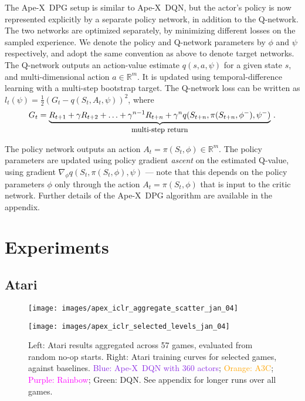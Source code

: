 \documentclass{article} \PassOptionsToPackage{usenames,dvipsnames}{xcolor}
\def\apex{Ape-X}
\def\smallcaption#1{\caption{\small #1}\vspace{-0.4cm}}
\begin{document}
The  \apex\ DPG setup is similar to \apex\ DQN, but the actor's policy is now represented explicitly by a separate policy network, in addition to the Q-network. The two networks are optimized separately, by minimizing different losses on the sampled experience. We denote the policy and Q-network parameters by $\phi$ and $\psi$ respectively, and adopt the same convention as above to denote target networks. The Q-network outputs an action-value estimate $q(s, a, \psi)$ for a given state $s$, and multi-dimensional action $a \in \mathbb{R}^m$. It is updated using temporal-difference learning with a multi-step bootstrap target. The Q-network loss can be written as $l_t(\psi) = \frac{1}{2}(G_t - q(S_t, A_t, \psi))^2$, where
\[
G_t = \underbrace{
    R_{t+1} + \gamma R_{t+2} + \ldots + \gamma^{n-1} R_{t+n} + \gamma^n q(S_{t+n}, \pi(S_{t+n}, \phi^-), \psi^-)}_{\mbox{\small multi-step return}} \,.
\]

The policy network outputs an action $A_t = \pi(S_t, \phi) \in \mathbb{R}^m$. The policy parameters are updated using policy gradient \emph{ascent} on the estimated Q-value, using gradient $\nabla_{\phi} q(S_t, \pi(S_t, \phi), \psi)$ --- note that this depends on the policy parameters $\phi$ only through the action $A_t =\pi(S_t, \phi)$ that is input to the critic network. Further details of the \apex\ DPG algorithm are available in the appendix.

\section{Experiments}

\subsection{Atari}
\begin{figure}
\begin{minipage}[t]{0.425\textwidth}
    \texttt{[image: images/apex\_iclr\_aggregate\_scatter\_jan\_04]}
\end{minipage}
\begin{minipage}[t]{0.575\textwidth}
    \texttt{[image: images/apex\_iclr\_selected\_levels\_jan\_04]}
\end{minipage}
    \smallcaption{Left: Atari results aggregated across 57 games, evaluated from random no-op starts. Right: Atari training curves for selected games, against baselines. \textcolor{BlueViolet}{Blue: \apex\ DQN with 360 actors}; \textcolor{Orange}{Orange: A3C}; \textcolor{Fuchsia}{Purple: Rainbow}; \textcolor{OliveGreen}{Green: DQN}. See appendix for longer runs over all games.}
    \label{fig:atari_aggregated_results}

\end{figure}
\end{document}

